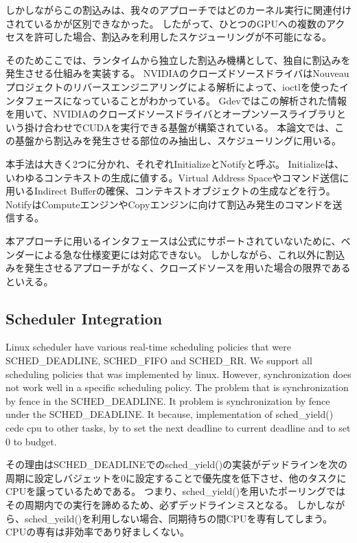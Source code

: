 しかしながらこの割込みは、我々のアプローチではどのカーネル実行に関連付けされているかが区別できなかった。
したがって、ひとつのGPUへの複数のアクセスを許可した場合、割込みを利用したスケジューリングが不可能になる。

そのためここでは、ランタイムから独立した割込み機構として、独自に割込みを発生させる仕組みを実装する。
NVIDIAのクローズドソースドライバはNouveauプロジェクトのリバースエンジニアリングによる解析によって、ioctlを使ったインタフェースになっていることがわかっている。
Gdevではこの解析された情報を用いて、NVIDIAのクローズドソースドライバとオープンソースライブラリという掛け合わせでCUDAを実行できる基盤が構築されている。
本論文では、この基盤から割込みを発生させる部位のみ抽出し、スケジューリングに用いる。

本手法は大きく2つに分かれ、それぞれInitializeとNotifyと呼ぶ。
Initializeは、いわゆるコンテキストの生成に値する。Virtual Address Spaceやコマンド送信に用いるIndirect Bufferの確保、コンテキストオブジェクトの生成などを行う。
NotifyはComputeエンジンやCopyエンジンに向けて割込み発生のコマンドを送信する。

本アプローチに用いるインタフェースは公式にサポートされていないために、ベンダーによる急な仕様変更には対応できない。
しかしながら、これ以外に割込みを発生させるアプローチがなく、クローズドソースを用いた場合の限界であるといえる。

\subsection{Scheduler Integration}
Linux scheduler have various real-time scheduling policies that were SCHED\_DEADLINE, SCHED\_FIFO and SCHED\_RR.
We support all scheduling policies that was implemented by linux.
However, synchronization does not work well in a specific scheduling policy.
The problem that is synchronization by fence in the SCHED\_DEADLINE.
It problem is synchronization by fence under the SCHED\_DEADLINE.
It because, implementation of sched\_yield() cede cpu to other tasks, by to set the next deadline to current deadline and to set 0 to budget.


その理由はSCHED\_DEADLINEでのsched\_yield()の実装がデッドラインを次の周期に設定しバジェットを0に設定することで優先度を低下させ、他のタスクにCPUを譲っているためである。
つまり、sched\_yield()を用いたポーリングではその周期内での実行を諦めるため、必ずデッドラインミスとなる。
しかしながら、sched\_yeild()を利用しない場合、同期待ちの間CPUを専有してしまう。
CPUの専有は非効率であり好ましくない。

